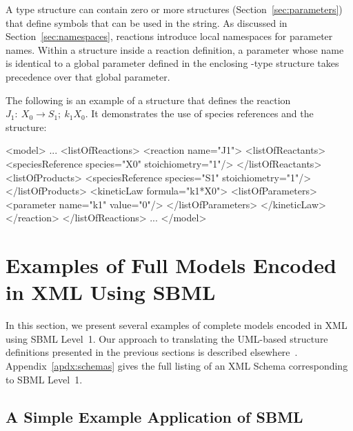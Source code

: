 \documentclass[10pt]{cekarticle}
\newcommand{\changed}[1]{\textcolor{BrickRed}{#1}}
\begin{document}
A  type structure can contain zero or more
 structures (Section~\ref{sec:parameters}) that define
symbols that can be used in the  string.  As discussed in
Section~\ref{sec:namespaces}, reactions introduce local namespaces for
parameter names.  Within a  structure inside a reaction
definition, a parameter whose name is identical to a global parameter
defined in the enclosing -type structure takes precedence over
that global parameter.

The following is an example of a  structure that defines
the reaction $J_1: \ X_0 \longrightarrow S_1; \ k_1 X_0$.  It demonstrates
the use of \changed{species} references and the 
structure:
\begin{example}
<model>
    ...
    <listOfReactions>
        <reaction name="J1">
            <listOfReactants>
                <\changed{speciesReference} \changed{species}="X0" stoichiometry="1"/>
            </listOfReactants>
            <listOfProducts>
                <\changed{speciesReference} \changed{species}="S1" stoichiometry="1"/>
            </listOfProducts>
            <kineticLaw formula="k1*X0">
                <listOfParameters>
                    <parameter name="k1" value="0"/>
                </listOfParameters>
            </kineticLaw>
        </reaction>
    </listOfReactions>
    ...
</model>
\end{example}


\section{Examples of Full Models Encoded in XML Using SBML}
\label{sec:xml-rep}

In this section, we present several examples of complete models encoded in
XML using SBML Level~1.  Our approach to translating the UML-based
structure definitions presented in the previous sections is described
elsewhere~\citep{hucka:2000b}.  Appendix~\ref{apdx:schemas} gives the full
listing of an XML Schema corresponding to SBML Level~1.


\subsection{A Simple Example Application of SBML}
\end{document}
